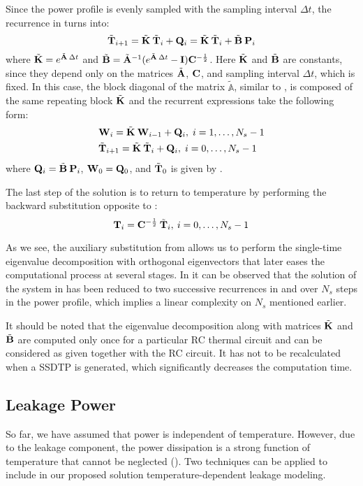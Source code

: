 Since the power profile is evenly sampled with the sampling interval $\Delta t$,
the recurrence in  turns into:
\[
  \tilde{\mathbf{T}}_{i+1} = \tilde{\mathbf{K}} \: \tilde{\mathbf{T}}_i + \mathbf{Q}_i = \tilde{\mathbf{K}} \: \tilde{\mathbf{T}}_i + \tilde{\mathbf{B}} \: \mathbf{P}_i
\]
where $\tilde{\mathbf{K}} = e^{\tilde{\mathbf{A}} \: \Delta t}$ and $\tilde{\mathbf{B}} = \tilde{\mathbf{A}}^{-1} ( e^{\tilde{\mathbf{A}} \:
\Delta t} - \mathbf{I} ) \mathbf{C}^{-\frac{1}{2}}$. Here $\tilde{\mathbf{K}}$ and $\tilde{\mathbf{B}}$ are
constants, since they depend only on the matrices $\tilde{\mathbf{A}}$, $\mathbf{C}$, and
sampling interval $\Delta t$, which is fixed. In this case, the block diagonal
of the matrix $\tilde{\mathbb{A}}$, similar to , is composed of the
same repeating block $\tilde{\mathbf{K}}$ and the recurrent expressions take the following
form:
\begin{align}
  & \m{W}_i = \tm{K} \: \m{W}_{i - 1} + \m{Q}_i, \; i = \range{1}{N_s - 1} \elab{final-p-recurrence} \\
  & \tv{T}_{i + 1} = \tm{K} \: \tv{T}_i + \m{Q}_i, \; i = \range{0}{N_s - 1} \elab{final-y-recurrence}
\end{align}
where $\mathbf{Q}_i = \tilde{\mathbf{B}} \: \mathbf{P}_i$, $\mathbf{W}_0 = \mathbf{Q}_0$, and $\tilde{\mathbf{T}}_0$ is
given by .

The last step of the solution is to return to temperature by performing the
backward substitution opposite to :
\[
  \mathbf{T}_i = \mathbf{C}^{-\frac{1}{2}} \: \tilde{\mathbf{T}}_i, \: i = 0, \dots, N_s - 1
\]

As we see, the auxiliary substitution from  allows us to
perform the single-time eigenvalue decomposition with orthogonal eigenvectors
that later eases the computational process at several stages. In
 it can be observed that the solution of the system in
 has been reduced to two successive recurrences in
 and  over $N_s$ steps in the
power profile, which implies a linear complexity on $N_s$ mentioned earlier.

It should be noted that the eigenvalue decomposition along with matrices
$\tilde{\mathbf{K}}$ and $\tilde{\mathbf{B}}$ are computed only once for a particular RC thermal circuit
and can be considered as given together with the RC circuit. It has not to be
recalculated when a SSDTP is generated, which significantly decreases the
computation time.

\subsection{Leakage Power}

So far, we have assumed that power is independent of temperature. However, due
to the leakage component, the power dissipation is a strong function of
temperature that cannot be neglected (). Two techniques can be
applied to include in our proposed solution temperature-dependent leakage
modeling.

